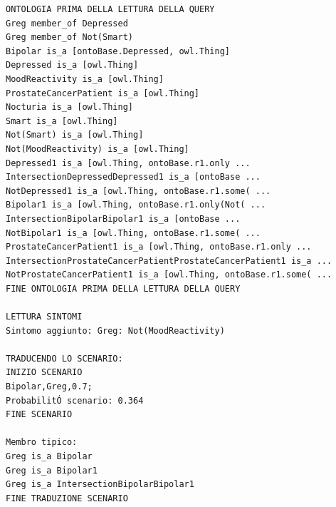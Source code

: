 \begin{verbatim}
ONTOLOGIA PRIMA DELLA LETTURA DELLA QUERY
Greg member_of Depressed
Greg member_of Not(Smart)
Bipolar is_a [ontoBase.Depressed, owl.Thing]
Depressed is_a [owl.Thing]
MoodReactivity is_a [owl.Thing]
ProstateCancerPatient is_a [owl.Thing]
Nocturia is_a [owl.Thing]
Smart is_a [owl.Thing]
Not(Smart) is_a [owl.Thing]
Not(MoodReactivity) is_a [owl.Thing]
Depressed1 is_a [owl.Thing, ontoBase.r1.only ...
IntersectionDepressedDepressed1 is_a [ontoBase ...
NotDepressed1 is_a [owl.Thing, ontoBase.r1.some( ...
Bipolar1 is_a [owl.Thing, ontoBase.r1.only(Not( ...
IntersectionBipolarBipolar1 is_a [ontoBase ...
NotBipolar1 is_a [owl.Thing, ontoBase.r1.some( ...
ProstateCancerPatient1 is_a [owl.Thing, ontoBase.r1.only ...
IntersectionProstateCancerPatientProstateCancerPatient1 is_a ...
NotProstateCancerPatient1 is_a [owl.Thing, ontoBase.r1.some( ...
FINE ONTOLOGIA PRIMA DELLA LETTURA DELLA QUERY

LETTURA SINTOMI
Sintomo aggiunto: Greg: Not(MoodReactivity)

TRADUCENDO LO SCENARIO: 
INIZIO SCENARIO
Bipolar,Greg,0.7; 
ProbabilitÓ scenario: 0.364
FINE SCENARIO

Membro tipico:
Greg is_a Bipolar
Greg is_a Bipolar1
Greg is_a IntersectionBipolarBipolar1
FINE TRADUZIONE SCENARIO


\end{verbatim}
